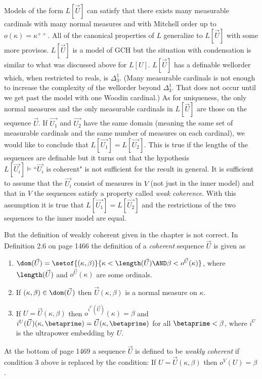 \documentclass[oneside,12pt]{amsart}
\begin{document}
Models of the form $L[\vec{U}]$ can satisfy
that there exists many measurable cardinals with many normal measures and
with Mitchell order up to $o(\kappa)=\kappa^{++}$. All of the canonical properties
of $L$ generalize to $L[\vec{U}]$ with some more provisos.
$L[\vec{U}]$ is a model of GCH but the situation with condensation is similar
to what was discussed above for $L[U]$. $L[\vec{U}]$ has a definable wellorder
which, when restricted to reals, is $\Delta^1_3$. (Many measurable cardinals is
not enough to increase the complexity of the wellorder beyond $\Delta^1_3$. That
does not occur until we get past the model with one Woodin cardinal.) As for uniqueness,
the only normal measures and the only measurable cardinals in $L[\vec{U}]$ are
those on the sequence $\vec{U}$. If $\vec{U_1}$ and $\vec{U_2}$ have the same
domain (meaning the same set of measurable cardinals and the same number
of measures on each cardinal), we would like to conclude that
$L[\vec{U_1}] = L[\vec{U_2}]$. This is true if the lengths of the sequences
are definable but it turns out that the hypothesis
$L[\vec{U_i}]\models \text{``}\vec{U_i} \text{ is coherent"}$
is not sufficient for the result in general. It is sufficient to assume that the $\vec{U_i}$ consist
of measures in $V$ (not just in the inner model) and that in $V$ the sequences satisfy a property called
\emph{weak coherence}. With this assumption it is true that $L[\vec{U_1}] = L[\vec{U_2}]$
and the restrictions of the two sequences to the inner model are equal.

But the definition of weakly coherent given in the chapter is not correct.
In Definition 2.6 on page 1466 the definition of a \emph{coherent} sequence $\vec{U}$
is given as
\begin{enumerate}
\item $\dom(\vec{U}) = \setof{(\kappa, \beta)}{\kappa < \length(\vec{U}) \AND \beta < o^{\vec{U}}(\kappa)}$,
where $\length(\vec{U})$ and  $o^{\vec{U}}(\kappa)$ are some ordinals.
\item If $(\kappa, \beta) \in \dom(\vec{U})$ then $\vec{U}(\kappa, \beta)$ is a normal measure on $\kappa$.
\item If $U=\vec{U}(\kappa, \beta)$ then $o^{i^{U}(\vec{U})}(\kappa) = \beta$ and $i^{U}(\vec{U})(\kappa, \betaprime)=
\vec{U}(\kappa, \betaprime)$ for all $\betaprime<\beta$, where $i^{U}$ is the ultrapower embedding by $U$.
\end{enumerate}


At the bottom of page 1469 a sequence $\vec{U}$ is defined to be \emph{weakly coherent}
if condition 3 above is replaced by the condition: If $U=\vec{U}(\kappa, \beta)$  then $o^{V}(U) = \beta$.
\end{document}
